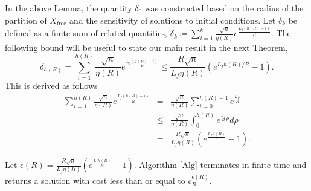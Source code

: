 \documentclass{llncs}
\begin{document}
In the above Lemma, the quantity $\delta_0$ was constructed based on the radius of the partition of $X_\mathrm{free}$ and the sensitivity of solutions to initial conditions. 
%
%
Let $\delta_k$ be defined as a finite sum of related quantities, $\delta_k\coloneqq\sum_{i=1}^{k}\frac{\sqrt{n}}{\eta(R)}e^{\frac{L_{f}(h(R)-i)}{R}}$. The following bound will be useful to state our main result in the next Theorem,
\begin{equation}
\delta_{h(R)}=\sum_{i=1}^{h(R)}\frac{\sqrt{n}}{\eta(R)}e^{\frac{L_{f}(h(R)-i)}{R}} \leq\frac{R\sqrt{n}}{L_{f}\eta(R)}\left(e^{L_{f}h(R)/R}-1\right).\label{eq:inequality}
\end{equation}
This is derived as follows 
\begin{equation}
\begin{array}{rcl}
\sum_{i=1}^{h(R)}\frac{\sqrt{n}}{\eta(R)}e^{\frac{L_{f}(h(R)-i)}{R}} & = & \frac{\sqrt{n}}{\eta(R)}\sum_{i=0}^{h(R)-1}e^{\frac{L_{f}i}{R}}\\
 & \leq & \frac{\sqrt{n}}{\eta(R)}\int_{0}^{h(R)}e^{\frac{L_{f}}{R}\rho}d\rho\\
 & = & \frac{R\sqrt{n}}{L_{f}\eta(R)}\left(e^{\frac{L_{f}h(R)}{R}}-1\right).
\end{array}
\end{equation}
\begin{theorem}\label{thm:main}
Let $\epsilon(R)=\frac{R\sqrt{n}}{L_{f}\eta(R)}\left(e^{\frac{L_{f}h(R)}{R}}-1\right)$. Algorithm \ref{Alg} terminates in finite time and returns a solution with cost less than or equal to $c^{\epsilon(R)}_R$.
\end{theorem}
%
\end{document}

